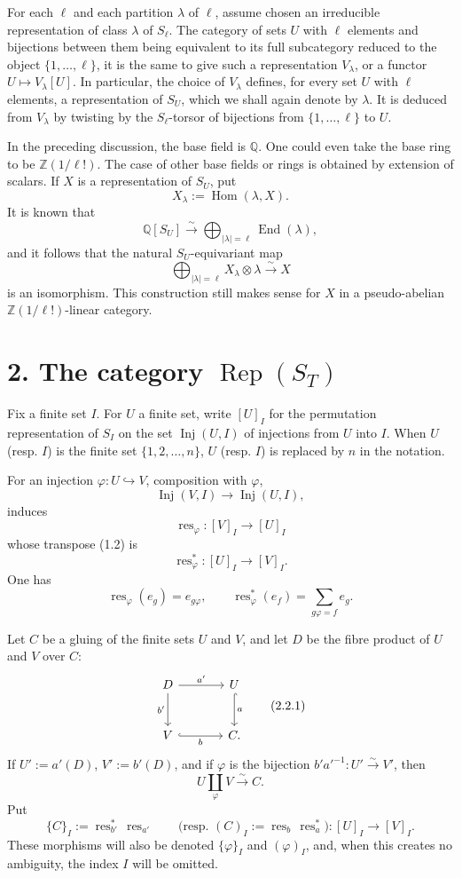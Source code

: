 \documentclass[11pt]{article}
\newcommand{\Rep}{\operatorname{Rep}}
\newcommand{\Hom}{\operatorname{Hom}}
\newcommand{\End}{\operatorname{End}}
\newcommand{\Inj}{\operatorname{Inj}}
\newcommand{\res}{\operatorname{res}}
\newcommand{\Z}{\mathbb Z}
\newcommand{\Q}{\mathbb Q}
\theoremstyle{deligne}
\newcommand{\para}[1]{\vspace{0.65em}\noindent{\bfseries #1}\quad}
\begin{document}
For each \(\ell\) and each partition \(\lambda\) of \(\ell\), assume chosen an irreducible representation of class \(\lambda\) of \(S_\ell\). The category of sets \(U\) with \(\ell\) elements and bijections between them being equivalent to its full subcategory reduced to the object \(\{1,\ldots,\ell\}\), it is the same to give such a representation \(V_\lambda\), or a functor \(U\mapsto V_\lambda[U]\). In particular, the choice of \(V_\lambda\) defines, for every set \(U\) with \(\ell\) elements, a representation of \(S_U\), which we shall again denote by \(\lambda\). It is deduced from \(V_\lambda\) by twisting by the \(S_\ell\)-torsor of bijections from \(\{1,\ldots,\ell\}\) to \(U\).

In the preceding discussion, the base field is \(\Q\). One could even take the base ring to be \(\Z(1/\ell!)\). The case of other base fields or rings is obtained by extension of scalars. If \(X\) is a representation of \(S_U\), put
\[
  X_\lambda:=\Hom(\lambda,X).
  \tag{1.10.1}
\]
It is known that
\[
  \Q[S_U]\overset{\sim}{\longrightarrow}
  \bigoplus_{|\lambda|=\ell}\End(\lambda),
  \tag{1.10.2}
\]
and it follows that the natural \(S_U\)-equivariant map
\[
  \bigoplus_{|\lambda|=\ell}X_\lambda\otimes\lambda
  \overset{\sim}{\longrightarrow} X
  \tag{1.10.3}
\]
is an isomorphism. This construction still makes sense for \(X\) in a pseudo-abelian \(\Z(1/\ell!)\)-linear category.

\section*{2. The category \(\Rep(S_T)\)}

\para{2.1.}
Fix a finite set \(I\). For \(U\) a finite set, write \([U]_I\) for the permutation representation of \(S_I\) on the set \(\Inj(U,I)\) of injections from \(U\) into \(I\). When \(U\) (resp. \(I\)) is the finite set \(\{1,2,\ldots,n\}\), \(U\) (resp. \(I\)) is replaced by \(n\) in the notation.

For an injection \(\varphi:U\hookrightarrow V\), composition with \(\varphi\),
\[
  \Inj(V,I)\longrightarrow \Inj(U,I),
\]
induces
\[
  \res_\varphi:[V]_I\longrightarrow [U]_I
\]
whose transpose (1.2) is
\[
  \res_\varphi^*:[U]_I\longrightarrow [V]_I.
\]
One has
\[
  \res_\varphi(e_g)=e_{g\varphi},\qquad
  \res_\varphi^*(e_f)=\sum_{g\varphi=f} e_g.
\]

\para{2.2.}
Let \(C\) be a gluing of the finite sets \(U\) and \(V\), and let \(D\) be the fibre product of \(U\) and \(V\) over \(C\):
\[
\begin{tikzcd}[column sep=large,row sep=large]
D \arrow[r,"a'"] \arrow[d,"b'"'] & U \arrow[d,"a",hook]\\
V \arrow[r,"b"',hook] & C .
\end{tikzcd}
\tag{2.2.1}
\]
If \(U':=a'(D)\), \(V':=b'(D)\), and if \(\varphi\) is the bijection \(b'a'^{-1}:U'\overset{\sim}{\to}V'\), then
\[
  U\coprod_\varphi V\overset{\sim}{\longrightarrow}C.
\]
Put
\[
  \{C\}_I:=\res_{b'}^*\,\res_{a'}
  \qquad
  \text{(resp. }(C)_I:=\res_b\,\res_a^*\text{)}:
  [U]_I\longrightarrow [V]_I.
\]
These morphisms will also be denoted \(\{\varphi\}_I\) and \((\varphi)_I\), and, when this creates no ambiguity, the index \(I\) will be omitted.
\end{document}
